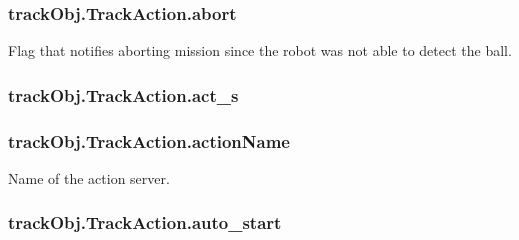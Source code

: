 \subsubsection[{\texorpdfstring{abort}{abort}}]{\setlength{\rightskip}{0pt plus 5cm}track\+Obj.\+Track\+Action.\+abort\hspace{0.3cm}{\ttfamily [static]}}\hypertarget{classtrackObj_1_1TrackAction_ae862caff1721b4555cb9531f7b3db772}{}\label{classtrackObj_1_1TrackAction_ae862caff1721b4555cb9531f7b3db772}


Flag that notifies aborting mission since the robot was not able to detect the ball. 

\subsubsection[{\texorpdfstring{act\+\_\+s}{act_s}}]{\setlength{\rightskip}{0pt plus 5cm}track\+Obj.\+Track\+Action.\+act\+\_\+s\hspace{0.3cm}{\ttfamily [static]}}\hypertarget{classtrackObj_1_1TrackAction_aa5b8f1f6070c7e75cab3f943359d6001}{}\label{classtrackObj_1_1TrackAction_aa5b8f1f6070c7e75cab3f943359d6001}
\subsubsection[{\texorpdfstring{action\+Name}{actionName}}]{\setlength{\rightskip}{0pt plus 5cm}track\+Obj.\+Track\+Action.\+action\+Name\hspace{0.3cm}{\ttfamily [static]}}\hypertarget{classtrackObj_1_1TrackAction_ad80530516be60157263ca1e57c59fed6}{}\label{classtrackObj_1_1TrackAction_ad80530516be60157263ca1e57c59fed6}


Name of the action server. 

\subsubsection[{\texorpdfstring{auto\+\_\+start}{auto_start}}]{\setlength{\rightskip}{0pt plus 5cm}track\+Obj.\+Track\+Action.\+auto\+\_\+start\hspace{0.3cm}{\ttfamily [static]}}\hypertarget{classtrackObj_1_1TrackAction_addeb2999e3821d35af77f6ff1d7b5098}{}\label{classtrackObj_1_1TrackAction_addeb2999e3821d35af77f6ff1d7b5098}
